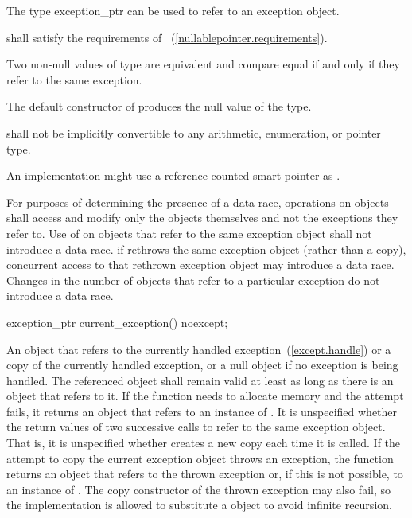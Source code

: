 \begin{itemdescr}
\pnum
The type exception_ptr can be used to refer to an exception object.

\pnum
{} shall satisfy the requirements of
~(\ref{nullablepointer.requirements}).

\pnum
Two non-null values of type  are equivalent and compare equal if and
only if they refer to the same exception.

\pnum
The default constructor of  produces the null value of the
type.

\pnum
{} shall not be implicitly convertible to any arithmetic,
enumeration, or pointer type.

\pnum
\enternote An implementation might use a reference-counted smart
pointer as . \exitnote

\pnum
For purposes of determining the presence of a data race, operations on
 objects shall access and modify only the
 objects themselves and not the exceptions they refer to.
Use of  on  objects that refer to
the same exception object shall not introduce a data race. \enternote if
 rethrows the same exception object (rather than a copy),
concurrent access to that rethrown exception object may introduce a data race.
Changes in the number of  objects that refer to a
particular exception do not introduce a data race. \exitnote
\end{itemdescr}

\begin{itemdecl}
exception_ptr current_exception() noexcept;
\end{itemdecl}

\begin{itemdescr}
\pnum
\returns An  object that refers to
the currently handled exception~(\ref{except.handle}) or a copy of the currently
handled exception, or a null  object if no exception is being
handled. The referenced object shall remain valid at least as long as there is an
 object that refers to it.
If the function needs to allocate memory and the attempt fails, it returns an
 object that refers to an instance of .
It is unspecified whether the return values of two successive calls to
 refer to the same exception object.
\enternote That is, it is unspecified whether 
creates a new copy each time it is called. \exitnote
If the attempt to copy the current exception object throws an exception, the function
returns an  object that refers to the thrown exception or,
if this is not possible, to an instance of . \enternote The
copy constructor of the thrown exception may also fail, so the implementation is allowed
to substitute a  object to avoid infinite
recursion.\exitnote
\end{itemdescr}


